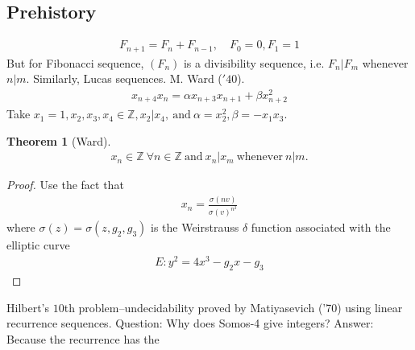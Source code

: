 \documentclass[12pt,reqno]{amsart}
\numberwithin{equation}{section}  %
\newcommand{\zz}{\mathbb{Z}}
\newtheorem{theorem}{Theorem}[section]
\begin{document}
\subsection{Prehistory} 
\label{ssec:prehistory}
%
%
\begin{equation*}
\begin{split}
  F_{n+1} = F_{n} + F_{n-1}, \quad F_{0}=0, F_{1}=1
\end{split}
\end{equation*}
%
%
But for Fibonacci sequence, $(F_{n})$ is a divisibility sequence, i.e.
$F_{n} \vert F_{m}$ whenever $n \vert m$. Similarly, Lucas sequences.
M. Ward ($'40$).
%
%
\begin{equation*}
\begin{split}
  x_{n+4} x_{n} = \alpha x_{n+3}x_{n+1} + \beta x_{n+2}^{2}
\end{split}
\end{equation*}
%
%
Take $x_{1} =1, x_{2},x_{3}, x_{4} \in \zz, x_{2} \vert x_{4}, \ \text{and} \
\alpha = x_{2}^{2}, \beta = -x_{1} x_{3}$. 
%
%
%
%
%
%
%
%
\begin{theorem}[Ward]
%
%
\begin{equation*}
\begin{split}
  x_{n} \in \zz \ \forall n \in \zz \ \text{and} \ x_{n} \vert x_{m} \
  \text{whenever} \ n \vert m.
\end{split}
\end{equation*}
%
%
%
%
%
%
\label{thm:main}
\end{theorem}
%
%
\begin{proof}
Use the fact that %
%
\begin{equation*}
\begin{split}
  x_{n} = \frac{\sigma(nv)}{\sigma(v)^{n^{2}}}
\end{split}
\end{equation*}
%
%
where $\sigma(z) = \sigma(z, g_{2}, g_{3})$ is the Weirstrauss $\delta$ function
associated with the elliptic curve
%
%
\begin{equation*}
\begin{split}
  E: y^{2}=4x^{3} - g_{2}x - g_{3}
\end{split}
\end{equation*}
%
%
\end{proof}
Hilbert's $10$th problem--undecidability proved by Matiyasevich ('70)
using linear recurrence sequences.
Question: Why does Somos-4 give integers? Answer: Because the recurrence has the
\end{document}
